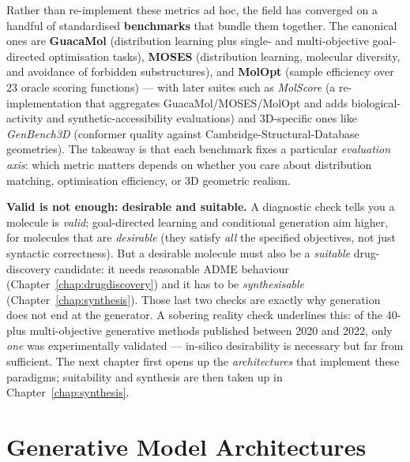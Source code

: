 \documentclass[11pt, oneside]{book}
\begin{document}
Rather than re-implement these metrics ad hoc, the field has converged on a handful of
standardised \textbf{benchmarks} that bundle them together. The canonical ones are
\textbf{GuacaMol} (distribution learning plus single- and multi-objective goal-directed
optimisation tasks), \textbf{MOSES} (distribution learning, molecular diversity, and
avoidance of forbidden substructures), and \textbf{MolOpt} (sample efficiency over $23$
oracle scoring functions) --- with later suites such as \emph{MolScore} (a re-implementation
that aggregates GuacaMol/MOSES/MolOpt and adds biological-activity and synthetic-accessibility
evaluations) and 3D-specific ones like \emph{GenBench3D} (conformer quality against
Cambridge-Structural-Database geometries). The takeaway is that each benchmark fixes a
particular \emph{evaluation axis}: which metric matters depends on whether you care about
distribution matching, optimisation efficiency, or 3D geometric realism.

\medskip
\noindent\textbf{Valid is not enough: desirable and suitable.} A diagnostic check tells you a
molecule is \emph{valid}; goal-directed learning and conditional generation aim higher, for
molecules that are \emph{desirable} (they satisfy \emph{all} the specified objectives, not just
syntactic correctness). But a desirable molecule must also be a \emph{suitable} drug-discovery
candidate: it needs reasonable ADME behaviour (Chapter~\ref{chap:drugdiscovery}) and it has to
be \emph{synthesisable} (Chapter~\ref{chap:synthesis}). Those last two checks are exactly why
generation does not end at the generator. A sobering reality check underlines this: of the
40-plus multi-objective generative methods published between 2020 and 2022, only \emph{one}
was experimentally validated --- in-silico desirability is necessary but far from sufficient.
The next chapter first opens up the
\emph{architectures} that implement these paradigms; suitability and synthesis are then
taken up in Chapter~\ref{chap:synthesis}.


\chapter{Generative Model Architectures}
\label{chap:generative2}
\end{document}
